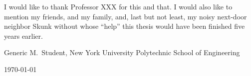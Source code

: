 
I would like to thank Professor XXX for this and that.  I would also
like to mention my friends, and my family, and, last but not least, my
noisy next-door neighbor Skunk without whose ``help'' this thesis would have
been finished five years earlier.

\bigskip\medskip

\noindent \hfill Generic M.\ Student, New York University Polytechnic School of Engineering

\hfill \today

